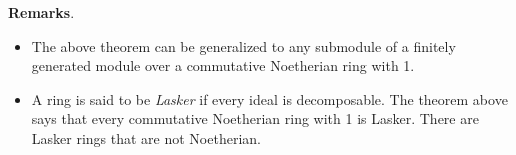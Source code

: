\documentclass[12pt]{article}
\begin{document}
\textbf{Remarks}.  
\begin{itemize}
\item
The above theorem can be generalized to any submodule of a finitely generated module over a commutative Noetherian ring with 1.
\item
A ring is said to be \emph{Lasker} if every ideal is decomposable.  The theorem above says that every commutative Noetherian ring with 1 is Lasker.  There are Lasker rings that are not Noetherian.
\end{itemize}
\end{document}
